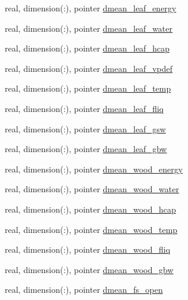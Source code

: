 \begin{DoxyCompactItemize}
\item 
real, dimension(\+:), pointer \hyperlink{structed__state__vars_1_1edtype_ae752a204afc208070a1f63185a14e8d4}{dmean\+\_\+leaf\+\_\+energy}
\item 
real, dimension(\+:), pointer \hyperlink{structed__state__vars_1_1edtype_ae8a23f14801ffbcd8e61f8cf9852b5c3}{dmean\+\_\+leaf\+\_\+water}
\item 
real, dimension(\+:), pointer \hyperlink{structed__state__vars_1_1edtype_a9b32c3458d9ff0e507b1a092ce41af99}{dmean\+\_\+leaf\+\_\+hcap}
\item 
real, dimension(\+:), pointer \hyperlink{structed__state__vars_1_1edtype_a3f21ea227229c17cb63d3ca82af558ef}{dmean\+\_\+leaf\+\_\+vpdef}
\item 
real, dimension(\+:), pointer \hyperlink{structed__state__vars_1_1edtype_a352bfe8337a87720f8dc4d4d3b9b4b56}{dmean\+\_\+leaf\+\_\+temp}
\item 
real, dimension(\+:), pointer \hyperlink{structed__state__vars_1_1edtype_a58b2c28df4cca9c438fdc87fae38badc}{dmean\+\_\+leaf\+\_\+fliq}
\item 
real, dimension(\+:), pointer \hyperlink{structed__state__vars_1_1edtype_aff2ae5b958b62be114889cc8d46dcc52}{dmean\+\_\+leaf\+\_\+gsw}
\item 
real, dimension(\+:), pointer \hyperlink{structed__state__vars_1_1edtype_ac008b4f03aea4ef160fe2110e99597aa}{dmean\+\_\+leaf\+\_\+gbw}
\item 
real, dimension(\+:), pointer \hyperlink{structed__state__vars_1_1edtype_a45b47c2a7b990a6bfbc9c8cae748cc1d}{dmean\+\_\+wood\+\_\+energy}
\item 
real, dimension(\+:), pointer \hyperlink{structed__state__vars_1_1edtype_adbc6ed807c54da71faad3024281c6714}{dmean\+\_\+wood\+\_\+water}
\item 
real, dimension(\+:), pointer \hyperlink{structed__state__vars_1_1edtype_a1bb60154c4356878e69b63e7a6f62f83}{dmean\+\_\+wood\+\_\+hcap}
\item 
real, dimension(\+:), pointer \hyperlink{structed__state__vars_1_1edtype_a1273560e999c39fe300b0e21bf39d585}{dmean\+\_\+wood\+\_\+temp}
\item 
real, dimension(\+:), pointer \hyperlink{structed__state__vars_1_1edtype_a323bc43e81d841ca20559f51f655dd32}{dmean\+\_\+wood\+\_\+fliq}
\item 
real, dimension(\+:), pointer \hyperlink{structed__state__vars_1_1edtype_a41b7404b054dd3c9a065d6786448dbf4}{dmean\+\_\+wood\+\_\+gbw}
\item 
real, dimension(\+:), pointer \hyperlink{structed__state__vars_1_1edtype_a8f627fbdc78de7581c0c9eb106ac8449}{dmean\+\_\+fs\+\_\+open}

\end{DoxyCompactItemize}
